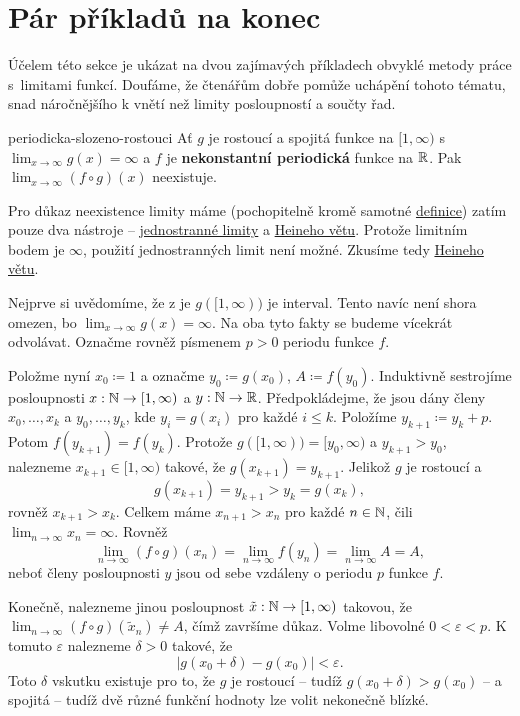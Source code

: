 \section{Pár příkladů na konec}
\label{sec:par-prikladu-na-konec}

Účelem této  sekce je ukázat na dvou zajímavých příkladech obvyklé
metody práce s~limitami funkcí. Doufáme, že čtenářům dobře pomůže uchápění
tohoto tématu, snad náročnějšího k vnětí než limity posloupností a součty řad.

\begin{example}{}{periodicka-slozeno-rostouci}
 Ať $g$ je rostoucí a spojitá funkce na $[1,\infty)$ s $\lim_{x \to \infty} g(x)
 = \infty$ a $f$ je \textbf{nekonstantní periodická} funkce na $\mathbb{R}$. Pak
 $\lim_{x \to \infty} (f \circ g)(x)$ neexistuje.

 Pro důkaz neexistence limity máme (pochopitelně kromě samotné
 \hyperref[def:oboustranna-limita-funkce]{definice}) zatím pouze dva nástroje --
 \hyperref[def:jednostranna-limita-funkce]{jednostranné limity} a
 \hyperref[thm:heineho]{Heineho větu}. Protože limitním bodem je $\infty$,
 použití jednostranných limit není možné. Zkusíme tedy
 \hyperref[thm:heineho]{Heineho větu}.

 Nejprve si uvědomíme, že z  je
 $g([1,\infty))$ je interval. Tento navíc není shora omezen, bo $\lim_{x \to
 \infty} g(x) = \infty$. Na oba tyto fakty se budeme vícekrát odvolávat. Označme
 rovněž písmenem $p > 0$ periodu funkce $f$.

 Položme nyní $x_0 \coloneqq 1$ a označme $y_0 \coloneqq g(x_0)$, $A \coloneqq
 f(y_0)$. Induktivně sestrojíme posloupnosti $x:\mathbb{N} \to [1,\infty)$ a $y:\mathbb{N} \to
 \mathbb{R}$. Předpokládejme, že jsou dány členy $x_0,\ldots,x_k$ a $y_0,\ldots,y_k$,
 kde $y_i = g(x_i)$ pro každé $i \leq k$. Položíme $y_{k+1} \coloneqq y_k + p$.
 Potom $f(y_{k+1}) = f(y_k)$. Protože $g([1,\infty)) = [y_0,\infty)$ a $y_{k+1}
 > y_0$, nalezneme $x_{k+1} \in [1,\infty)$ takové, že $g(x_{k+1}) = y_{k+1}$.
 Jelikož $g$ je rostoucí a
 \[
  g(x_{k+1}) = y_{k+1} > y_k = g(x_k),
 \]
 rovněž $x_{k+1} > x_k$. Celkem máme $x_{n+1} > x_n$ pro každé $n \in \mathbb{N}$, čili
 $\lim_{n \to \infty} x_n = \infty$. Rovněž
 \[
  \lim_{n \to \infty} (f \circ g)(x_n) = \lim_{n \to \infty} f(y_n) = \lim_{n
  \to \infty} A = A,
 \]
 neboť členy posloupnosti $y$ jsou od sebe vzdáleny o periodu $p$ funkce $f$.

 Konečně, nalezneme jinou posloupnost $\tilde{x}:\mathbb{N} \to [1,\infty)$ takovou, že
 $\lim_{n \to \infty} (f \circ g)(\tilde{x}_n) \neq A$, čímž završíme důkaz.
 Volme libovolné $0 < \varepsilon < p$. K tomuto $\varepsilon$ nalezneme
 $\delta>0$ takové, že
 \[
  |g(x_0 + \delta) - g(x_0)| < \varepsilon.
 \]
 Toto $\delta$ vskutku existuje pro to, že $g$ je rostoucí -- tudíž $g(x_0 +
 \delta) > g(x_0)$ -- a spojitá -- tudíž dvě různé funkční hodnoty lze volit
 nekonečně blízké.


\end{example}
